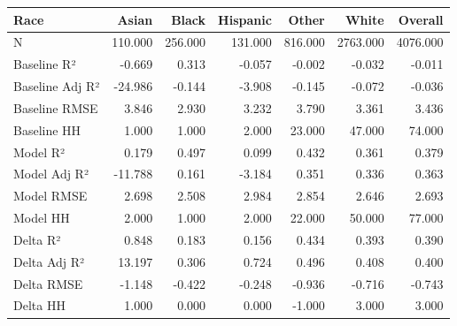 \begin{tabular}{lrrrrrr}
\toprule
Race &   Asian &   Black &  Hispanic &   Other &    White &  Overall \\
\midrule
N               & 110.000 & 256.000 &   131.000 & 816.000 & 2763.000 & 4076.000 \\
Baseline R²     &  -0.669 &   0.313 &    -0.057 &  -0.002 &   -0.032 &   -0.011 \\
Baseline Adj R² & -24.986 &  -0.144 &    -3.908 &  -0.145 &   -0.072 &   -0.036 \\
Baseline RMSE   &   3.846 &   2.930 &     3.232 &   3.790 &    3.361 &    3.436 \\
Baseline HH     &   1.000 &   1.000 &     2.000 &  23.000 &   47.000 &   74.000 \\
Model R²        &   0.179 &   0.497 &     0.099 &   0.432 &    0.361 &    0.379 \\
Model Adj R²    & -11.788 &   0.161 &    -3.184 &   0.351 &    0.336 &    0.363 \\
Model RMSE      &   2.698 &   2.508 &     2.984 &   2.854 &    2.646 &    2.693 \\
Model HH        &   2.000 &   1.000 &     2.000 &  22.000 &   50.000 &   77.000 \\
Delta R²        &   0.848 &   0.183 &     0.156 &   0.434 &    0.393 &    0.390 \\
Delta Adj R²    &  13.197 &   0.306 &     0.724 &   0.496 &    0.408 &    0.400 \\
Delta RMSE      &  -1.148 &  -0.422 &    -0.248 &  -0.936 &   -0.716 &   -0.743 \\
Delta HH        &   1.000 &   0.000 &     0.000 &  -1.000 &    3.000 &    3.000 \\
\bottomrule
\end{tabular}

